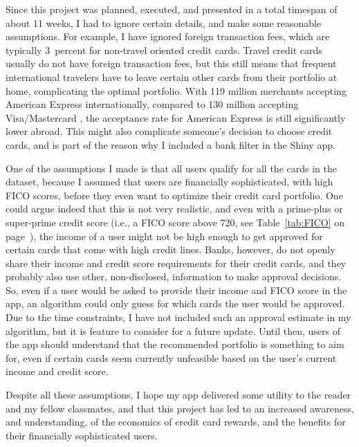 Since this project was planned, executed, and presented in a total timespan of about 11 weeks, I had to ignore certain details, and make some reasonable assumptions. 
For example, I have ignored foreign transaction fees, which are typically 3~percent for non-travel oriented credit cards. 
Travel credit cards usually do not have foreign transaction fees, but this still means that frequent international travelers have to leave certain other cards from their portfolio at home, complicating the optimal portfolio.
With 119 million merchants accepting American Express internationally, compared to 130 million accepting Visa/Mastercard \citep{thriftytraveler:2024}, the acceptance rate for American Express is still significantly lower abroad. 
This might also complicate someone's decision to choose credit cards, and is part of the reason why I included a bank filter in the \textsf{Shiny} app. 

One of the assumptions I made is that all users qualify for all the cards in the dataset, because I assumed that users are financially sophisticated, with high FICO scores, before they even want to optimize their credit card portfolio.  
One could argue indeed that this is not very realistic, and even with a prime-plus or super-prime credit score (i.e., a FICO score above 720, see Table~\ref{tab:FICO} on page~\pageref{tab:FICO}), the income of a user might not be high enough to get approved for certain cards that come with high credit lines. 
Banks, however, do not openly share their income and credit score requirements for their credit cards, and they probably also use other, non-disclosed, information to make approval decisions. 
So, even if a user would be asked to provide their income and FICO score in the app, 
an algorithm could only guess for which cards the user would be approved. 
Due to the time constraints, I have not included such an approval estimate in my algorithm, but it is feature to consider for a future update.
Until then, users of the app should understand that the recommended portfolio is something to aim for, even if certain cards seem currently unfeasible based on the user's current income and credit score. 

Despite all these assumptions, I hope my app delivered some utility to the reader and my fellow classmates, and that this project has led to an increased awareness, and understanding, of the economics of credit card rewards, and the benefits for their financially sophisticated users. 
